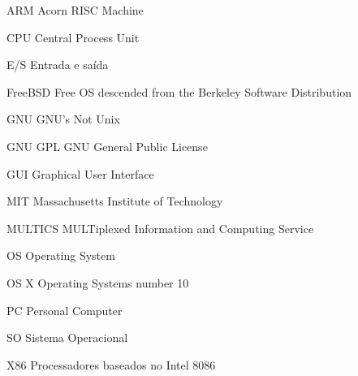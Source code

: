 \begin{siglas}
    \item[ARM] Acorn RISC Machine
    \item[CPU] Central Process Unit
    \item[E/S] Entrada e saída
    \item[FreeBSD] Free OS descended from the 
    Berkeley Software Distribution 
    \item[GNU] GNU's Not Unix
    \item[GNU GPL] GNU General Public License
    \item[GUI] Graphical User Interface
    \item[MIT] Massachusetts Institute of Technology
    \item[MULTICS] MULTiplexed Information and Computing Service 
    \item[OS] Operating System  
    \item[OS X] Operating Systems number 10 
    \item[PC] Personal Computer
    \item[SO] Sistema Operacional
    \item[X86] Processadores baseados no Intel 8086
\end{siglas}